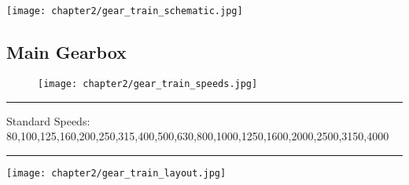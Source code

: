 \setcounter{section}{10}
\begin{minipage}{\textwidth}
    \begin{adjustwidth}{-2cm}{-3cm}
        \centering
        \texttt{[image: chapter2/gear\_train\_schematic.jpg]}
    \end{adjustwidth}
    \label{fig:gear_train}
\end{minipage}

\newpage
\subsection[\texorpdfstring{14.48805/14.488111 (50/60Hz)}{14.48805-14.488111}]%
{Main Gearbox}

\vspace{-.5cm}

\begin{figure}[h]
    \centering
    \texttt{[image: chapter2/gear\_train\_speeds.jpg]}
\end{figure}

\rule{1.08\textwidth}{0.5pt}
\footnotesize Standard Speeds: 80,100,125,160,200,250,315,400,500,630,800,1000,1250,1600,2000,2500,3150,4000
\rule{1.08\textwidth}{0.5pt}

\vspace{.5cm}

\texttt{[image: chapter2/gear\_train\_layout.jpg]}
